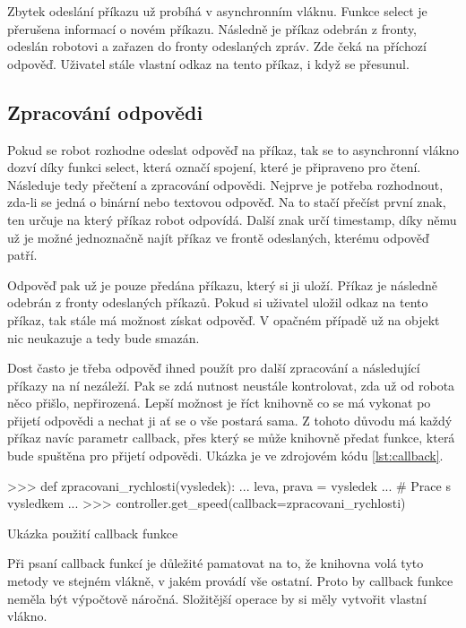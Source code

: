 \documentclass[12pt,notitlepage]{report}
\begin{document}
    Zbytek odeslání příkazu už probíhá v asynchronním vláknu. Funkce select je
    přerušena informací o novém příkazu. Následně je příkaz odebrán z fronty,
    odeslán robotovi a zařazen do fronty odeslaných zpráv. Zde čeká na příchozí
    odpověď. Uživatel stále vlastní odkaz na tento příkaz, i když se přesunul.

    \subsection{Zpracování odpovědi}

    Pokud se robot rozhodne odeslat odpověď na příkaz, tak se to asynchronní
    vlákno dozví díky funkci select, která označí spojení, které je připraveno
    pro čtení. Následuje tedy přečtení a zpracování odpovědi. Nejprve je
    potřeba rozhodnout, zda-li se jedná o binární nebo textovou odpověď. Na to
    stačí přečíst první znak, ten určuje na který příkaz robot odpovídá. Další
    znak určí timestamp, díky němu už je možné jednoznačně najít příkaz ve
    frontě odeslaných, kterému odpověď patří.

    Odpověď pak už je pouze předána příkazu, který si ji uloží. Příkaz je
    následně odebrán z fronty odeslaných příkazů. Pokud si uživatel uložil
    odkaz na tento příkaz, tak stále má možnost získat odpověď. V opačném
    případě už na objekt nic neukazuje a tedy bude smazán.

    Dost často je třeba odpověď ihned použít pro další zpracování a následující
    příkazy na ní nezáleží. Pak se zdá nutnost neustále kontrolovat, zda už od
    robota něco přišlo, nepřirozená. Lepší možnost je říct knihovně co se má
    vykonat po přijetí odpovědi a nechat ji ať se o vše postará sama. Z tohoto
    důvodu má každý příkaz navíc parametr callback, přes který se může knihovně
    předat funkce, která bude spuštěna pro přijetí odpovědi. Ukázka je ve
    zdrojovém kódu \ref{lst:callback}.

    \begin{listing}
    \begin{pyc}
>>> def zpracovani_rychlosti(vysledek):
...    leva, prava = vysledek
...    # Prace s vysledkem
...
>>> controller.get_speed(callback=zpracovani_rychlosti)
    \end{pyc}
    \caption{Ukázka použití callback funkce}
    \label{lst:callback}
    \end{listing}

    Při psaní callback funkcí je důležité pamatovat na to, že knihovna volá
    tyto metody ve stejném vlákně, v jakém provádí vše ostatní. Proto by
    callback funkce neměla být výpočtově náročná. Složitější operace by si měly
    vytvořit vlastní vlákno.
\end{document}

